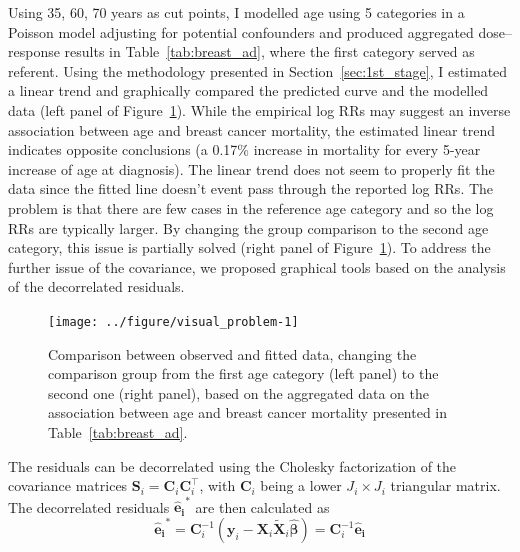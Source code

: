 \documentclass[11pt,a4paper,twoside,openany]{book}\usepackage{knitr}
\begin{document}
{{Using 35, 60, 70 years as cut points, I modelled age using 5 categories in a Poisson model adjusting for potential confounders and produced aggregated dose--response results in Table~\ref{tab:breast_ad}, where the first category served as referent. Using the methodology presented in Section~\ref{sec:1st_stage}, I estimated a linear trend and graphically compared the predicted curve and the modelled data (left panel of Figure~\ref{fig:visual_problem}). While the empirical log RRs may suggest an inverse association between age and breast cancer mortality, the estimated linear trend indicates opposite conclusions (a 0.17\% increase in mortality for every 5-year increase of age at diagnosis). The linear trend does not seem to properly fit the data since the fitted line doesn't event pass through the reported log RRs. The problem is that there are few cases in the reference age category and so the log RRs are typically larger. By changing the group comparison to the second age category, this issue is partially solved (right panel of Figure~\ref{fig:visual_problem}). To address the further issue of the covariance, we proposed graphical tools based on the analysis of the decorrelated residuals.

\begin{knitrout}\footnotesize
{}\color{fgcolor}\begin{figure}[ht!]

{\centering \texttt{[image: ../figure/visual\_problem-1]} 

}

\caption{Comparison between observed and fitted data, changing the comparison group from the first age category (left panel) to the second one (right panel), based on the aggregated data on the association between age and breast cancer mortality presented in Table~\ref{tab:breast_ad}.}\label{fig:visual_problem}
\end{figure}


\end{knitrout}

The residuals can be decorrelated using the Cholesky factorization of the covariance matrices $\mathbf{S}_i = \mathbf{C}_i\mathbf{C}_i^\top$, with $\mathbf{C}_i$ being a lower  $J_i \times J_i$ triangular matrix. The decorrelated residuals $\boldsymbol{\hat e_i}^*$ are then calculated as
\begin{equation}
\boldsymbol{\hat e_i}^* = \mathbf{C}_i^{-1} \left(\mathbf{y}_i - \mathbf{X}_i \widetilde{\mathbf{X}}_i \boldsymbol{\hat \beta} \right) = \mathbf{C}_i^{-1}\boldsymbol{\hat e_i}
\label{eq:decor_res}
\end{equation}

}}
\end{document}
